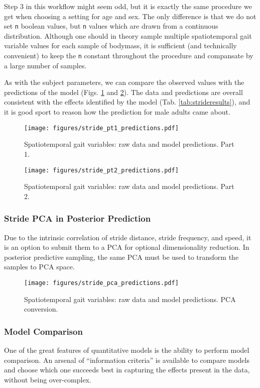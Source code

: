 Step 3 in this workflow might seem odd, but it is exactly the same procedure we get when choosing a setting for age and sex.
The only difference is that we do not set \texttt{n} boolean values, but \texttt{n} values which are drawn from a continuous distribution.
Although one should in theory sample multiple spatiotemporal gait variable values for each sample of bodymass, it is sufficient (and technically convenient) to keep the \texttt{n} constant throughout the procedure and compansate by a large number of samples.


As with the subject parameters, we can compare the observed values with the predictions of the model (Figs. \ref{fig:stride1} and \ref{fig:stride2}).
The data and predictions are overall consistent with the effects identified by the model (Tab. \ref{tab:strideresults}), and it is good sport to reason how the prediction for male adults came about.


\begin{figure}[p]
\centering
\texttt{[image: figures/stride\_pt1\_predictions.pdf]}
\caption{\label{fig:stride1}Spatiotemporal gait variables: raw data and model predictions. Part 1.}
\end{figure}

\begin{figure}[p]
\centering
\texttt{[image: figures/stride\_pt2\_predictions.pdf]}
\caption{\label{fig:stride2}Spatiotemporal gait variables: raw data and model predictions. Part 2.}
\end{figure}



\subsubsection{Stride PCA in Posterior Prediction}
\label{sec:org82b0840}
Due to the intrinsic correlation of stride distance, stride frequency, and speed, it is an option to submit them to a PCA for optional dimensionality reduction.
In posterior predictive sampling, the same PCA must be used to transform the samples to PCA space.

\begin{figure}[p]
\centering
\texttt{[image: figures/stride\_pca\_predictions.pdf]}
\caption{\label{fig:stridepca}Spatiotemporal gait variables: raw data and model predictions. PCA conversion.}
\end{figure}



\subsubsection{Model Comparison}
\label{strides:comparison}
One of the great features of quantitative models is the ability to perform model comparison.
An arsenal of ``information criteria'' is available to compare models and choose which one succeeds best in capturing the effects present in the data, without being over-complex.

